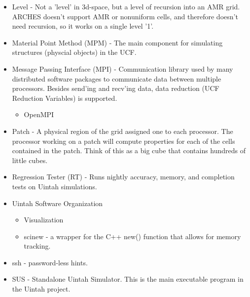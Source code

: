 \begin{itemize}
\item Level - Not a 'level' in 3d-space, but a level of recursion into an
  AMR grid.  ARCHES doesn't support AMR or nonuniform cells, and
  therefore doesn't need recursion, so it works on a single level '1'.

\item Material Point Method (MPM) - The main component for simulating
  structures (physcial objects) in the UCF.

\item Message Passing Interface (MPI) - Communication library used by many
  distributed software packages to communicate data between multiple
  processors.  Besides send'ing and recv'ing data, data
  reduction (UCF Reduction Variables) is supported. 
  \begin{itemize}
    \item OpenMPI
  \end{itemize}

\item Patch - A physical region of the grid assigned one to each
  processor.  The processor working on a patch will compute properties
  for each of the cells contained in the patch.  Think of this as a big
  cube that contains hundreds of little cubes.

\item Regression Tester (RT) - Runs nightly accuracy, memory, and
  completion tests on Uintah simulations.


\item Uintah Software Organization
  \begin{itemize}
    \item Visualization
    \item scinew - a wrapper for the C++ new() function that allows for memory tracking.
  \end{itemize}

\item ssh - password-less hints.

\item SUS - Standalone Uintah Simulator.  This is the main executable
  program in the Uintah project.


\end{itemize}

